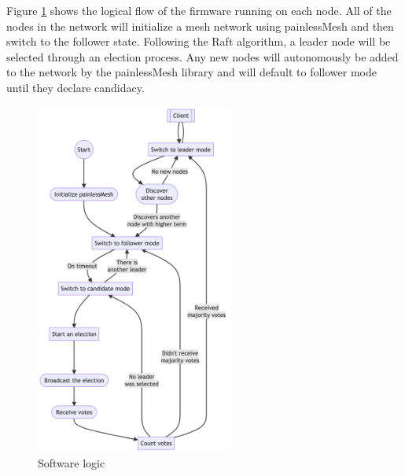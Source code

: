 Figure \ref{fig:flow} shows the logical flow of the firmware running on each node. All of the nodes in the network will initialize a mesh network using painlessMesh and then switch to the follower state. Following the Raft algorithm, a leader node will be selected through an election process. Any new nodes will autonomously be added to the network by the painlessMesh library and will default to follower mode until they declare candidacy.

\begin{figure}[H]
    \centering
    \includegraphics[width=0.58\textwidth]{images/final_design.png}
    \caption{Software logic}
    \label{fig:flow}






\end{figure}

